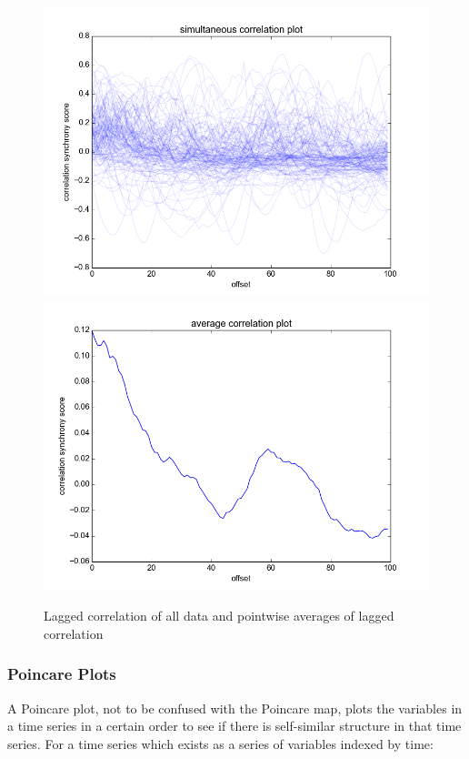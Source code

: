 \documentclass[12pt]{article}
\begin{document}
\begin{figure}\label{fig:lag_correlation}
  \begin{center}
    \includegraphics[scale=0.6]{correlation_mc}
    \includegraphics[scale=0.6]{correlation_summary}
  \end{center}
  \caption{Lagged correlation of all data and pointwise averages of lagged correlation}
\end{figure}

\subsubsection{Poincare Plots}

A Poincare plot\cite{hrv1}, not to be confused with the Poincare map, plots the variables in a time series in a certain order to see if there is self-similar structure in that time series. For a time series which exists as a series of variables indexed by time:
\end{document}
